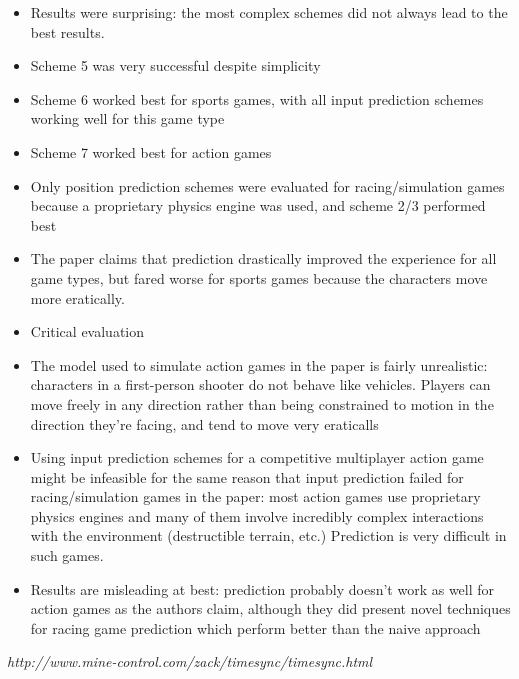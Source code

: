 \documentclass[conference]{IEEEtran}
\begin{document}
\begin{itemize}
		\item Results were surprising: the most complex schemes did not always lead to the best results.
		\item Scheme 5 was very successful despite simplicity
		\item Scheme 6 worked best for sports games, with all input prediction schemes working well for this game type
		\item Scheme 7 worked best for action games
		\item Only position prediction schemes were evaluated for racing/simulation games because a proprietary physics engine was used, and scheme 2/3 performed best
		\item The paper claims that prediction drastically improved the experience for all game types, but fared worse for sports games because the characters move more eratically.
		\item Critical evaluation
		\item The model used to simulate action games in the paper is fairly unrealistic: characters in a first-person shooter do not behave like vehicles. Players can move freely in any direction rather than being constrained to motion in the direction they're facing, and tend to move very eraticalls
		\item Using input prediction schemes for a competitive multiplayer action game might be infeasible for the same reason that input prediction failed for racing/simulation games in the paper: most action games use proprietary physics engines and many of them involve incredibly complex interactions with the environment (destructible terrain, etc.) Prediction is very difficult in such games.
		\item Results are misleading at best: prediction probably doesn't work as well for action games as the authors claim, although they did present novel techniques for racing game prediction which perform better than the naive approach
	\end{itemize}

	\emph{http://www.mine-control.com/zack/timesync/timesync.html}
\end{document}
